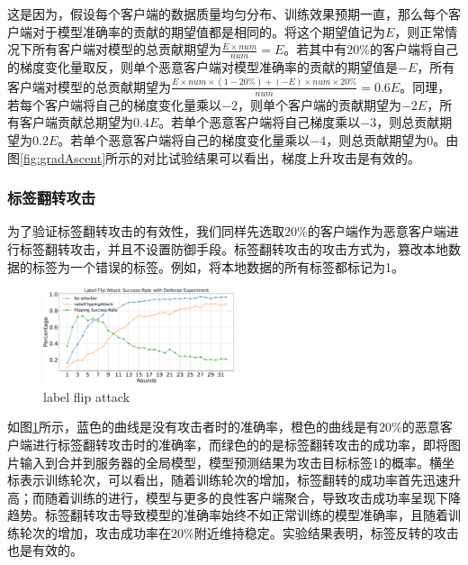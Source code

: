 \documentclass[conference]{IEEEtran}
\def\figLabelFlip{0.5\textwidth}
\begin{document}
这是因为，假设每个客户端的数据质量均匀分布、训练效果预期一直，那么每个客户端对于模型准确率的贡献的期望值都是相同的。将这个期望值记为$E$，则正常情况下所有客户端对模型的总贡献期望为$\frac{E\times num}{num}=E$。若其中有$20\%$的客户端将自己的梯度变化量取反，则单个恶意客户端对模型准确率的贡献的期望值是$-E$，所有客户端对模型的总贡献期望为$\frac{E\times num\times(1-20\%)+(-E)\times num\times 20\%}{num} = 0.6E$。同理，若每个客户端将自己的梯度变化量乘以$-2$，则单个客户端的贡献期望为$-2E$，所有客户端贡献总期望为$0.4E$。若单个恶意客户端将自己梯度乘以$-3$，则总贡献期望为$0.2E$。若单个恶意客户端将自己的梯度变化量乘以$-4$，则总贡献期望为$0$。由图\hyperref[fig:gradAscent]{\ref{fig:gradAscent}}所示的对比试验结果可以看出，梯度上升攻击是有效的。

\subsubsection{\textbf{标签翻转攻击}}
\label{exp:attack:label}

为了验证标签翻转攻击的有效性，我们同样先选取$20\%$的客户端作为恶意客户端进行标签翻转攻击，并且不设置防御手段。标签翻转攻击的攻击方式为，篡改本地数据的标签为一个错误的标签。例如，将本地数据的所有标签都标记为1。

\begin{figure}[htbp]
    \centerline{\includegraphics[width=\figLabelFlip]{pics/002-LabelFlippingAttack-attackRate.pdf}}
    \caption{label flip attack}
    \label{fig:labelFlip}
\end{figure}

如图\hyperref[fig:labelFlip]{\ref{fig:labelFlip}}所示，蓝色的曲线是没有攻击者时的准确率，橙色的曲线是有$20\%$的恶意客户端进行标签翻转攻击时的准确率，而绿色的的是标签翻转攻击的成功率，即将图片输入到合并到服务器的全局模型，模型预测结果为攻击目标标签1的概率。横坐标表示训练轮次，可以看出，随着训练轮次的增加，标签翻转的成功率首先迅速升高；而随着训练的进行，模型与更多的良性客户端聚合，导致攻击成功率呈现下降趋势。标签翻转攻击导致模型的准确率始终不如正常训练的模型准确率，且随着训练轮次的增加，攻击成功率在$20\%$附近维持稳定。实验结果表明，标签反转的攻击也是有效的。
\end{document}
